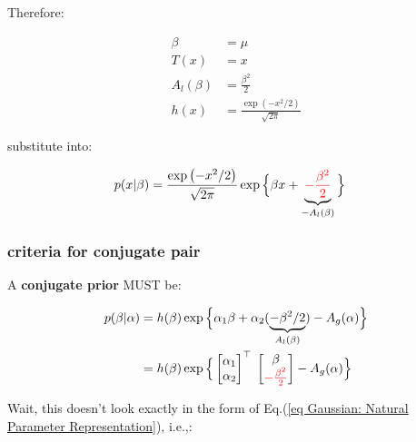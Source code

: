 \documentclass{article}
\begin{document}
Therefore:

\begin{equation}\begin{split}
\beta &= \mu\\
T(x)  &= x\\
A_l(\beta) &= \frac{\beta^2}{2}\\
h(x) &= \frac{\exp \left( - x^2/2   \right) }{\sqrt{2 \pi} }
\end{split}\end{equation}

substitute into:

\begin{equation}\begin{split}
p( x | \beta ) 
&=  \frac{\exp \left( - x^2/2   \right) }{\sqrt{2 \pi} } \exp \Big\{ \beta x  + \underbrace{ {\color{red}-  \frac{ \beta^2}{2 }}}_{-A_l(\beta)}  \Big\}
\end{split}\end{equation}


\subsubsection{criteria for conjugate pair}



A {\bf conjugate prior} MUST be: 

\begin{equation}\begin{split}\label{eq conjugate prior for variance one Gaussian}
p (\beta | \alpha) &= h (\beta) \exp \Big\{   \alpha_1 \beta   + \alpha_2 ( \underbrace{- \beta^2/2}_{A_l(\beta)} )   - A_g (\alpha)	\Big\}\\
&= h (\beta) \exp \Big\{   \begin{bmatrix}  \alpha_1 \\ \alpha_2\end{bmatrix}^\top \; \begin{bmatrix}  \beta   \\   {\color{red}-\frac{\beta^2}{2}} \end{bmatrix}  - A_g (\alpha) \Big\}
\end{split}\end{equation}

Wait, this doesn't look exactly in the form of Eq.(\ref{eq Gaussian: Natural Parameter Representation}), i.e.,:
\end{document}
